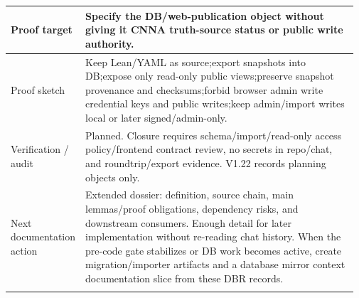 \begin{longtable}{L{0.16\linewidth} L{0.81\linewidth}}
\hline\addlinespace[0.20em]
Proof target & Specify the DB/\allowbreak{}web-publication object without giving it CNNA truth-source status or public write authority.\\
\hline\addlinespace[0.20em]
Proof sketch & Keep Lean/\allowbreak{}YAML as source;\newline export snapshots into DB;\newline expose only read-only public views;\newline preserve snapshot provenance and checksums;\newline forbid browser admin write credential keys and public writes;\newline keep admin/\allowbreak{}import writes local or later signed/\allowbreak{}admin-only.\\
\hline\addlinespace[0.20em]
Verification /\allowbreak{} audit & Planned. Closure requires schema/\allowbreak{}import/\allowbreak{}read-only access policy/\allowbreak{}frontend contract review, no secrets in repo/\allowbreak{}chat, and roundtrip/\allowbreak{}export evidence. V1.22 records planning objects only.\\
\hline\addlinespace[0.20em]
Next documentation action & Extended dossier: definition, source chain, main lemmas/\allowbreak{}proof obligations, dependency risks, and downstream consumers. Enough detail for later implementation without re-reading chat history. When the pre-code gate stabilizes or DB work becomes active, create migration/\allowbreak{}importer artifacts and a database mirror context documentation slice from these DBR records.\\
\hline\addlinespace[0.20em]
\end{longtable}
